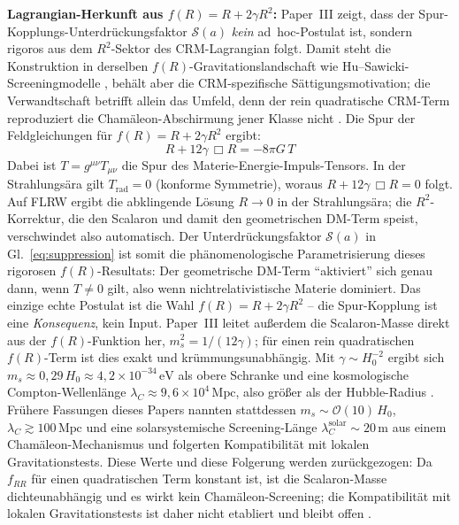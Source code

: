 \documentclass[aps,prd,twocolumn,superscriptaddress,nofootinbib,floatfix]{revtex4-2}
\begin{document}
\textbf{Lagrangian-Herkunft aus $f(R) = R + 2\gamma R^2$:} Paper~III \cite{Geiger2026c} zeigt, dass der Spur-Kopplungs-Unterdrückungsfaktor $\mathcal{S}(a)$ \textit{kein} ad~hoc-Postulat ist, sondern rigoros aus dem $R^2$-Sektor des CRM-Lagrangian folgt. Damit steht die Konstruktion in derselben $f(R)$-Gravitationslandschaft wie Hu--Sawicki-Screeningmodelle \cite{HuSawicki2007}, behält aber die CRM-spezifische Sättigungsmotivation; die Verwandtschaft betrifft allein das Umfeld, denn der rein quadratische CRM-Term reproduziert die Chamäleon-Abschirmung jener Klasse nicht \cite{Geiger2026c}. Die Spur der Feldgleichungen für $f(R) = R + 2\gamma R^2$ ergibt:
\begin{equation}
R + 12\gamma\,\Box R = -8\pi G\,T
\label{eq:trace_fR}
\end{equation}
Dabei ist $T = g^{\mu\nu}T_{\mu\nu}$ die Spur des Materie-Energie-Impuls-Tensors. In der Strahlungsära gilt $T_{\mathrm{rad}} = 0$ (konforme Symmetrie), woraus $R + 12\gamma\,\Box R = 0$ folgt. Auf FLRW ergibt die abklingende Lösung $R \to 0$ in der Strahlungsära; die $R^2$-Korrektur, die den Scalaron und damit den geometrischen DM-Term speist, verschwindet also automatisch. Der Unterdrückungsfaktor $\mathcal{S}(a)$ in Gl.~\eqref{eq:suppression} ist somit die phänomenologische Parametrisierung dieses rigorosen $f(R)$-Resultats: Der geometrische DM-Term "`aktiviert"' sich genau dann, wenn $T \neq 0$ gilt, also wenn nichtrelativistische Materie dominiert. Das einzige echte Postulat ist die Wahl $f(R) = R + 2\gamma R^2$ -- die Spur-Kopplung ist eine \textit{Konsequenz}, kein Input. Paper~III leitet außerdem die Scalaron-Masse direkt aus der $f(R)$-Funktion her, $m_s^2 = 1/(12\gamma)$; für einen rein quadratischen $f(R)$-Term ist dies exakt und krümmungsunabhängig. Mit $\gamma \sim H_0^{-2}$ ergibt sich $m_s \approx 0{,}29\,H_0 \approx 4{,}2 \times 10^{-34}\,\mathrm{eV}$ als obere Schranke und eine kosmologische Compton-Wellenlänge $\lambda_C \approx 9{,}6 \times 10^{4}\,\mathrm{Mpc}$, also größer als der Hubble-Radius \cite{Geiger2026c}. Frühere Fassungen dieses Papers nannten stattdessen $m_s \sim \mathcal{O}(10)\,H_0$, $\lambda_C \gtrsim 100\,\mathrm{Mpc}$ und eine solarsystemische Screening-Länge $\lambda_C^{\mathrm{solar}} \sim 20\,\mathrm{m}$ aus einem Chamäleon-Mechanismus und folgerten Kompatibilität mit lokalen Gravitationstests. Diese Werte und diese Folgerung werden zurückgezogen: Da $f_{RR}$ für einen quadratischen Term konstant ist, ist die Scalaron-Masse dichteunabhängig und es wirkt kein Chamäleon-Screening; die Kompatibilität mit lokalen Gravitationstests ist daher nicht etabliert und bleibt offen \cite{Geiger2026c}.
\end{document}
